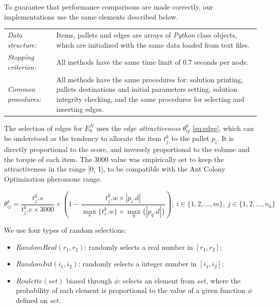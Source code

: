 \documentclass[preprint,authoryear]{elsarticle}
\begin{document}
To guarantee that performance comparisons are made correctly, our implementations use the same elements described below.


\bgroup
\def\arraystretch{1.2}
\begin{table}[H]
	\centering
	\small
	\begin{tabular}{CD}
		
		{\it Data structure:}     & Items, pallets and edges are arrays of \emph{Python} class objects, which are initialized with the same data loaded from text files. \\
		
		{\it Stopping criterion:} & All methods have the same time limit of $0.7$ seconds per node.\\
		
		{\it Common procedures:}  & All methods have the same procedures for: solution printing, pallets destinations and initial parameters setting, solution integrity checking, and the same procedures for selecting and inserting edges.\\

	\end{tabular}
	\normalsize
\end{table}
\egroup

The selection of edges for $E^N_k$\/ uses the {\it edge attractiveness}\/ $\theta^k_{ij}$\/ \ref{eq:edge}, which can be understood as the tendency to allocate the item $t^k_j$\/ to the pallet $p_i$. It is directly proportional to the score, and inversely proportional to the volume and the torque of each item. The 3000 value was empirically set to keep the attractiveness in the range [0, 1], to be compatible with the Ant Colony Optimization pheromone range.

\begin{equation} \label{eq:edge}
	\theta^k_{ij}= \frac{t^k_j.s}{t^k_j.v \times 3000}\times(1-\frac{t^k_j.w\times|p_i.d|}{\max_s\{t^k_s.w\}\times\max_q\{|p_q.d|\}});\ i \in \{1,2,\ldots,m\},\ j \in \{1,2,\ldots,n_k\}
\end{equation} 


We use four types of random selections:
\begin{itemize}
	\item $RandomReal(r_1,r_2)$: randomly selects a real number in $[r_1,r_2]$;
	\item $RandomInt(i_1,i_2)$: randomly selects a integer number in $[i_1,i_2]$;
	\item $Roulette(set)$ biased through $\phi$: selects an element from $set$, where the probability of each element is proportional to the value of a given function $\phi$\/ defined on $set$.
\end{itemize}
\end{document}
